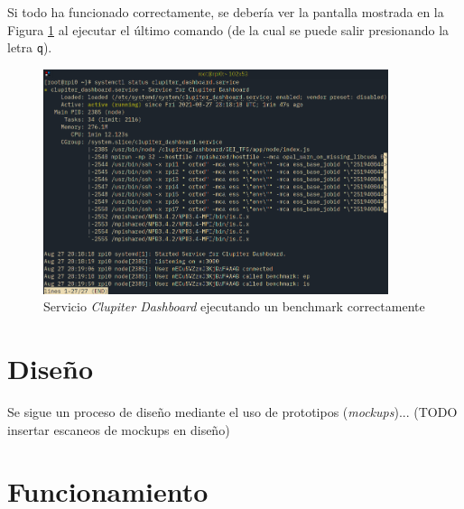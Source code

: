 Si todo ha funcionado correctamente, se debería ver la pantalla mostrada en la Figura \ref{fig:systemd_clupiter_dashboard} al ejecutar el último comando (de la cual se puede salir presionando la letra \texttt{q}).

\begin{figure}[H]
  \centering
  \vspace*{0.5cm}
  \includegraphics[width=0.9\textwidth]{img/systemd_clupiter_dashboard.png}
  \caption{Servicio \textit{Clupiter Dashboard} ejecutando un benchmark correctamente}
  \label{fig:systemd_clupiter_dashboard}
\end{figure}

\section{Diseño}
Se sigue un proceso de diseño mediante el uso de prototipos (\textit{mockups})... (TODO insertar escaneos de mockups en diseño)

\section{Funcionamiento}

